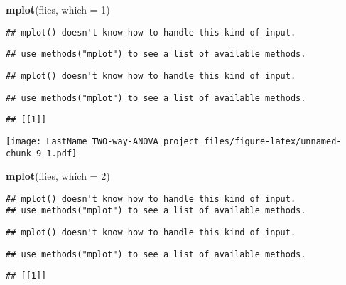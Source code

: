 \documentclass[]{article}
\newenvironment{Shaded}{\begin{snugshade}}{\end{snugshade}}
\newcommand{\DataTypeTok}[1]{\textcolor[rgb]{0.13,0.29,0.53}{#1}}
\newcommand{\DecValTok}[1]{\textcolor[rgb]{0.00,0.00,0.81}{#1}}
\newcommand{\KeywordTok}[1]{\textcolor[rgb]{0.13,0.29,0.53}{\textbf{#1}}}
\newcommand{\NormalTok}[1]{#1}
\begin{document}
\begin{Shaded}
\begin{Highlighting}[]
\KeywordTok{mplot}\NormalTok{(flies, }\DataTypeTok{which =} \DecValTok{1}\NormalTok{)}
\end{Highlighting}
\end{Shaded}

\begin{verbatim}
## mplot() doesn't know how to handle this kind of input.
\end{verbatim}

\begin{verbatim}
## use methods("mplot") to see a list of available methods.
\end{verbatim}

\begin{verbatim}
## mplot() doesn't know how to handle this kind of input.
\end{verbatim}

\begin{verbatim}
## use methods("mplot") to see a list of available methods.
\end{verbatim}

\begin{verbatim}
## [[1]]
\end{verbatim}

\texttt{[image: LastName\_TWO-way-ANOVA\_project\_files/figure-latex/unnamed-chunk-9-1.pdf]}

\begin{Shaded}
\begin{Highlighting}[]
\KeywordTok{mplot}\NormalTok{(flies, }\DataTypeTok{which =} \DecValTok{2}\NormalTok{)}
\end{Highlighting}
\end{Shaded}

\begin{verbatim}
## mplot() doesn't know how to handle this kind of input.
## use methods("mplot") to see a list of available methods.
\end{verbatim}

\begin{verbatim}
## mplot() doesn't know how to handle this kind of input.
\end{verbatim}

\begin{verbatim}
## use methods("mplot") to see a list of available methods.
\end{verbatim}

\begin{verbatim}
## [[1]]
\end{verbatim}
\end{document}
